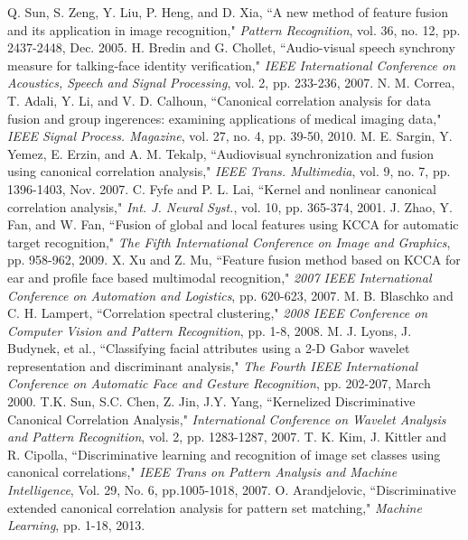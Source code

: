 \documentclass[journal]{IEEEtran}
\begin{document}
\begin{thebibliography}{1}
Q. Sun, S. Zeng, Y. Liu, P. Heng, and D. Xia, ``A new method of feature fusion and its application in image recognition," \emph{Pattern Recognition}, vol. 36, no. 12, pp. 2437-2448, Dec. 2005.
H. Bredin and G. Chollet, ``Audio-visual speech synchrony measure for talking-face identity verification,"  \emph{IEEE International Conference on Acoustics, Speech and Signal Processing}, vol. 2, pp. 233-236, 2007.
N. M. Correa, T. Adali, Y. Li, and V. D. Calhoun, ``Canonical correlation analysis for data fusion and group ingerences: examining applications of medical imaging data," \emph{IEEE Signal Process. Magazine}, vol. 27, no. 4, pp. 39-50, 2010.
M. E. Sargin, Y. Yemez, E. Erzin, and A. M. Tekalp, ``Audiovisual synchronization and fusion using canonical correlation analysis," \emph{IEEE Trans. Multimedia}, vol. 9, no. 7, pp. 1396-1403, Nov. 2007.
C. Fyfe and P. L. Lai, ``Kernel and nonlinear canonical correlation analysis," \emph{Int. J. Neural Syst.}, vol. 10, pp. 365-374, 2001.
J. Zhao, Y. Fan, and W. Fan, ``Fusion of global and local features using KCCA for automatic target recognition," \emph{The Fifth International Conference on Image and Graphics}, pp. 958-962, 2009.
X. Xu and Z. Mu, ``Feature fusion method based on KCCA for ear and profile face based multimodal recognition,"  \emph{2007 IEEE International Conference on Automation and Logistics}, pp. 620-623, 2007.
M. B. Blaschko and C. H. Lampert, ``Correlation spectral clustering," \emph{ 2008 IEEE Conference on Computer Vision and Pattern Recognition}, pp. 1-8, 2008.
M. J. Lyons, J. Budynek, et al., ``Classifying facial attributes using a 2-D Gabor wavelet representation and discriminant analysis," \emph{The Fourth IEEE International Conference on Automatic Face and Gesture Recognition}, pp. 202-207, March 2000.
T.K. Sun, S.C. Chen, Z. Jin, J.Y. Yang, ``Kernelized Discriminative Canonical Correlation Analysis," \emph{International Conference on Wavelet Analysis and Pattern Recognition}, vol. 2, pp. 1283-1287, 2007.
T. K. Kim, J. Kittler and R. Cipolla, ``Discriminative learning and recognition of image set classes using canonical correlations," \emph{IEEE Trans on Pattern Analysis and Machine Intelligence}, Vol. 29, No. 6, pp.1005-1018, 2007.
O. Arandjelovic, ``Discriminative extended canonical correlation analysis for pattern set matching," \emph{Machine Learning}, pp. 1-18, 2013.

\end{thebibliography}
\end{document}
